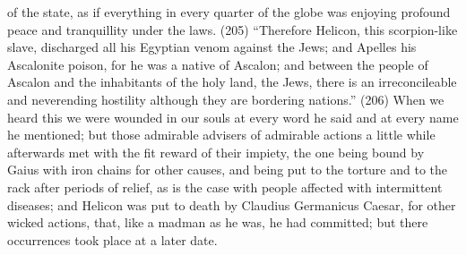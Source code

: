 of the state, as if everything in every quarter of the globe was enjoying profound peace and
tranquillity under the laws. (205) ``Therefore Helicon, this scorpion-like slave, discharged all his
Egyptian venom against the Jews; and Apelles his Ascalonite poison, for he was a native of
Ascalon; and between the people of Ascalon and the inhabitants of the holy land, the Jews, there is
an irreconcileable and neverending hostility although they are bordering nations.'' (206) When we
heard this we were wounded in our souls at every word he said and at every name he mentioned;
but those admirable advisers of admirable actions a little while afterwards met with the fit reward of
their impiety, the one being bound by Gaius with iron chains for other causes, and being put to the
torture and to the rack after periods of relief, as is the case with people affected with intermittent
diseases; and Helicon was put to death by Claudius Germanicus Caesar, for other wicked actions,
that, like a madman as he was, he had committed; but there occurrences took place at a later date.

